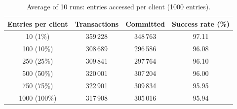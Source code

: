 \begin{table}[h]
\centering
\caption{Average of 10 runs: entries accessed per client (1000 entries).}
\begin{tabular}{|c|c|c|c|}
\hline
Entries per client & Transactions & Committed & Success rate (\%) \\
\hline
10 (1\%) & 359\,228 & 348\,763 & 97.11 \\
100 (10\%) & 308\,689 & 296\,586 & 96.08 \\
250 (25\%) & 309\,841 & 297\,764 & 96.10 \\
500 (50\%) & 320\,001 & 307\,204 & 96.00 \\
750 (75\%) & 322\,901 & 309\,834 & 95.95 \\
1000 (100\%) & 317\,908 & 305\,016 & 95.94 \\
\hline
\end{tabular}
\end{table}

